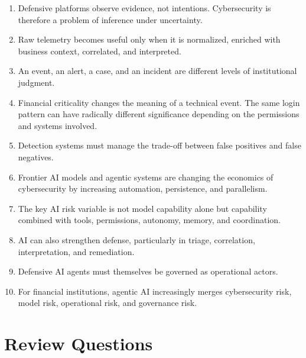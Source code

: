 \begin{enumerate}
    \item Defensive platforms observe evidence, not intentions. Cybersecurity is therefore a problem of inference under uncertainty.
    \item Raw telemetry becomes useful only when it is normalized, enriched with business context, correlated, and interpreted.
    \item An event, an alert, a case, and an incident are different levels of institutional judgment.
    \item Financial criticality changes the meaning of a technical event. The same login pattern can have radically different significance depending on the permissions and systems involved.
    \item Detection systems must manage the trade-off between false positives and false negatives.
    \item Frontier AI models and agentic systems are changing the economics of cybersecurity by increasing automation, persistence, and parallelism.
    \item The key AI risk variable is not model capability alone but capability combined with tools, permissions, autonomy, memory, and coordination.
    \item AI can also strengthen defense, particularly in triage, correlation, interpretation, and remediation.
    \item Defensive AI agents must themselves be governed as operational actors.
    \item For financial institutions, agentic AI increasingly merges cybersecurity risk, model risk, operational risk, and governance risk.
\end{enumerate}

\section{Review Questions}

